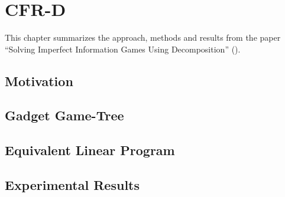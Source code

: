 \chapter{CFR-D}

This chapter summarizes the approach, methods and results from the paper ``Solving Imperfect Information Games Using Decomposition'' (\cite{BurchJohansonBowling13}).

\section{Motivation}

\section{Gadget Game-Tree}

\section{Equivalent Linear Program}

\section{Experimental Results}
